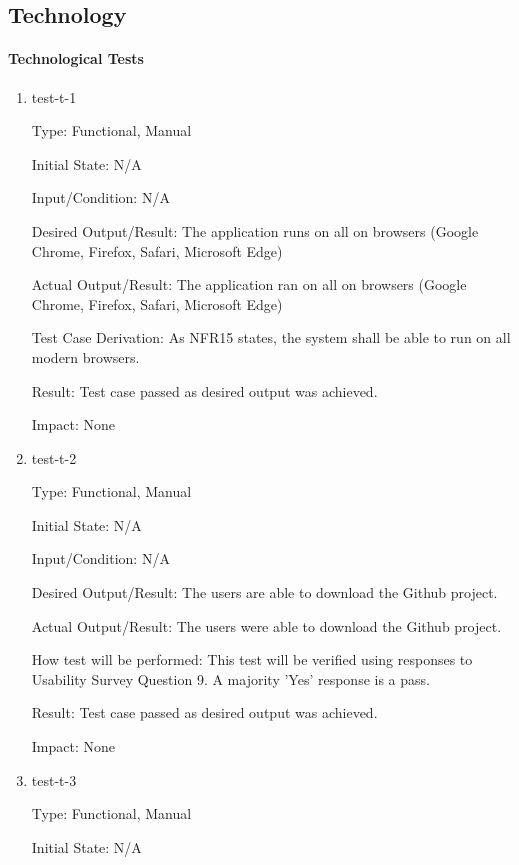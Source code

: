 \documentclass[12pt, titlepage]{article}
\begin{document}
\subsection{Technology}

\paragraph{Technological Tests}

\begin{enumerate}

\item{test-t-1\\}

Type: Functional, Manual		

Initial State: N/A	

Input/Condition: N/A		

Desired Output/Result: The application runs on all on browsers (Google Chrome, Firefox, Safari, Microsoft Edge)

Actual Output/Result: The application ran on all on browsers (Google Chrome, Firefox, Safari, Microsoft Edge)

Test Case Derivation: As NFR15 states, the system shall be able to run on all modern browsers.

Result: Test case passed as desired output was achieved.

Impact: None

\item{test-t-2\\}

Type: Functional, Manual

Initial State: N/A

Input/Condition: N/A

Desired Output/Result: The users are able to download the Github project.

Actual Output/Result: The users were able to download the Github project.

How test will be performed: This test will be verified using responses to Usability Survey Question 9. A majority 'Yes' response is a pass.

Result: Test case passed as desired output was achieved.

Impact: None

\item{test-t-3\\}

Type: Functional, Manual

Initial State: N/A


\end{enumerate}
\end{document}
